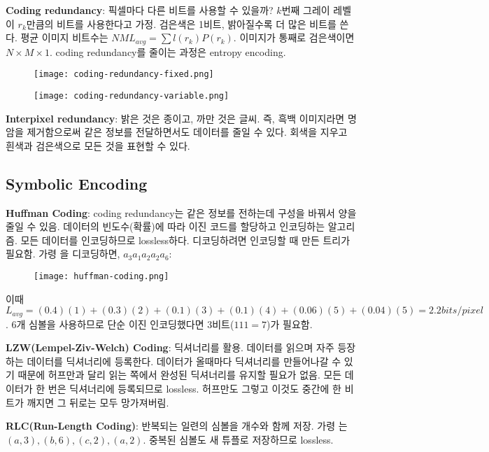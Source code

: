 \textbf{Coding redundancy}: 픽셀마다 다른 비트를 사용할 수 있을까? $k$번째 그레이 레벨이 $r_k$만큼의 비트를 사용한다고 가정. 검은색은 1비트, 밝아질수록 더 많은 비트를 쓴다. 평균 이미지 비트수는 $NML_{avg} = \sum l(r_k)P(r_k)$. 이미지가 통째로 검은색이면 $N \times M \times 1$. coding redundancy를 줄이는 과정은 entropy encoding.

\begin{figure}[h]
  \centering
  \texttt{[image: coding-redundancy-fixed.png]}
\end{figure}

\begin{figure}[h]
  \centering
  \texttt{[image: coding-redundancy-variable.png]}
\end{figure}

\textbf{Interpixel redundancy}: 밝은 것은 종이고, 까만 것은 글씨. 즉, 흑백 이미지라면 명암을 제거함으로써 같은 정보를 전달하면서도 데이터를 줄일 수 있다. 회색을 지우고 흰색과 검은색으로 모든 것을 표현할 수 있다.

\subsection{Symbolic Encoding}

\textbf{Huffman Coding}: coding redundancy는 같은 정보를 전하는데 구성을 바꿔서 양을 줄일 수 있음. 데이터의 빈도수(확률)에 따라 이진 코드를 할당하고 인코딩하는 알고리즘. 모든 데이터를 인코딩하므로 lossless하다. 디코딩하려면 인코딩할 때 만든 트리가 필요함. 가령 을 디코딩하면, $a_3 a_1 a_2 a_2 a_6$:

\begin{figure}[h]
  \centering
  \texttt{[image: huffman-coding.png]}
\end{figure}

이때 $L_{avg} = (0.4)(1) + (0.3)(2) + (0.1)(3) + (0.1)(4) + (0.06)(5) + (0.04)(5) = 2.2bits/pixel$. 6개 심볼을 사용하므로 단순 이진 인코딩했다면 3비트($111 = 7$)가 필요함.

\textbf{LZW(Lempel-Ziv-Welch) Coding}: 딕셔너리를 활용. 데이터를 읽으며 자주 등장하는 데이터를 딕셔너리에 등록한다. 데이터가 올때마다 딕셔너리를 만들어나갈 수 있기 때문에 허프만과 달리 읽는 쪽에서 완성된 딕셔너리를 유지할 필요가 없음. 모든 데이터가 한 번은 딕셔너리에 등록되므로 lossless. 허프만도 그렇고 이것도 중간에 한 비트가 깨지면 그 뒤로는 모두 망가져버림.

\textbf{RLC(Run-Length Coding)}: 반복되는 일련의 심볼을 개수와 함께 저장. 가령 는 $(a, 3), (b, 6), (c, 2), (a, 2)$. 중복된 심볼도 새 튜플로 저장하므로 lossless.


